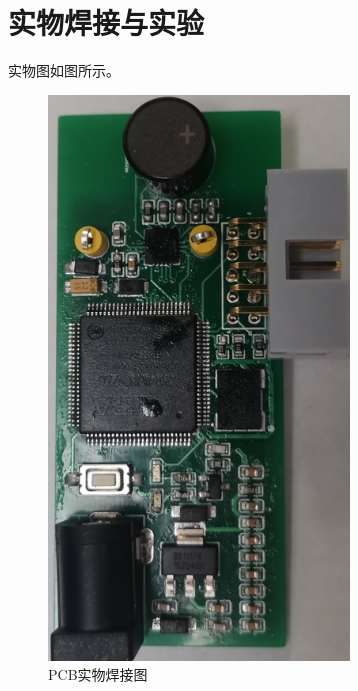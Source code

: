    \newpage
	\section{实物焊接与实验}
	实物图如图所示。
	\begin{figure}[H]
	    \centering
	    \includegraphics[width=8cm,angle=-90]{figure/physical map.png}
	    \caption{PCB实物焊接图}
	    \label{PCB实物焊接图}
	\end{figure}